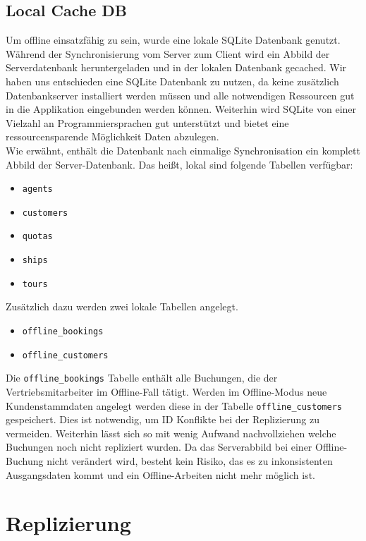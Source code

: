 \documentclass[12pt,a4paper,ngerman,english]{report}
\begin{document}
\subsection{Local Cache DB}
Um offline einsatzfähig zu sein, wurde eine lokale SQLite Datenbank genutzt. Während der Synchronisierung vom Server zum Client wird ein Abbild der Serverdatenbank heruntergeladen und in der lokalen Datenbank gecached. Wir haben uns entschieden eine SQLite Datenbank zu nutzen, da keine zusätzlich Datenbankserver installiert werden müssen und alle notwendigen Ressourcen gut in die Applikation eingebunden werden können. Weiterhin wird SQLite von einer Vielzahl an Programmiersprachen gut unterstützt und bietet eine ressourcensparende Möglichkeit Daten abzulegen. \\
Wie erwähnt, enthält die Datenbank nach einmalige Synchronisation ein komplett Abbild der Server-Datenbank. Das heißt, lokal sind folgende Tabellen verfügbar:
\begin{itemize}
	\setlength\itemsep{0.1em}
	\item \texttt{agents}
	\item \texttt{customers}
	\item \texttt{quotas}
	\item \texttt{ships}
	\item \texttt{tours}
\end{itemize}
Zusätzlich dazu werden zwei lokale Tabellen angelegt.
\begin{itemize}
	\setlength\itemsep{0.1em}
	\item \texttt{offline\_bookings}
	\item \texttt{offline\_customers}
\end{itemize}
Die \texttt{offline\_bookings} Tabelle enthält alle Buchungen, die der Vertriebsmitarbeiter im Offline-Fall tätigt. Werden im Offline-Modus neue Kundenstammdaten angelegt werden diese in der Tabelle \texttt{offline\_customers} gespeichert. Dies ist notwendig, um ID Konflikte bei der Replizierung zu vermeiden. Weiterhin lässt sich so mit wenig Aufwand nachvollziehen welche Buchungen noch nicht repliziert wurden. Da das Serverabbild bei einer Offline-Buchung nicht verändert wird, besteht kein Risiko, das es zu inkonsistenten Ausgangsdaten kommt und ein Offline-Arbeiten nicht mehr möglich ist.

\section{Replizierung}
\label{sec:Replizierung}
\end{document}
